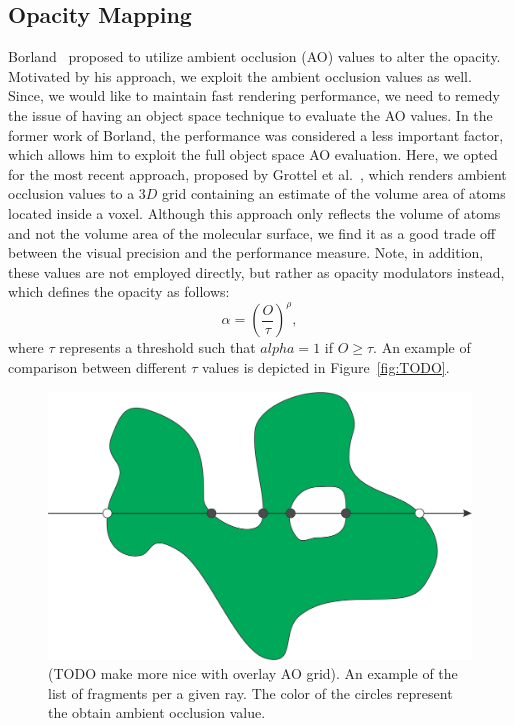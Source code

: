\subsection{Opacity Mapping}
Borland~\cite{borland2011ambient} proposed to utilize ambient occlusion (AO) values to alter the opacity. Motivated by his approach, we exploit the ambient occlusion values as well. Since, we would like to maintain fast rendering performance, we need to remedy the issue of having an object space technique to evaluate the AO values. In the former work of Borland, the performance was considered a less important factor, which allows him to exploit the full object space AO evaluation. Here, we opted for the most recent approach, proposed by Grottel et al.~\cite{grottel2012object}, which renders ambient occlusion values to a $3D$ grid containing an estimate of the volume area of atoms located inside a voxel. Although this approach only reflects the volume of atoms and not the volume area of the molecular surface, we find it as a good trade off between the visual precision and the performance measure. Note, in addition, these values are not employed directly, but rather as opacity modulators instead, which defines the opacity as follows:
\begin{equation}
  \alpha = \left( \frac{O}{\tau}\right)^\rho,
	\label{eq:alpha}
\end{equation}
where $\tau$ represents a threshold such that $alpha=1$ if $O\geq\tau$. An example of comparison between different $\tau$ values is depicted in Figure~\ref{fig:TODO}.
\begin{figure}[htb]
\centering
  \includegraphics[width=0.8\columnwidth]{image/ray_fragments.png}
  \caption{(TODO make more nice with overlay AO grid). An example of the list of fragments per a given ray. The color of the circles represent the obtain ambient occlusion value.}
	\label{fig:ray_fragments}
\end{figure}

